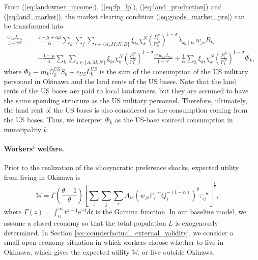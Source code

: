 \documentclass[12pt, unicode, a4paper]{article}
\newcommand{\1}{\mbox{1}\hspace{-0.25em}\mbox{l}} %
\begin{document}
From (\ref{eq:landowner_income}), (\ref{eq:fp_lp}), (\ref{eq:land_production}) and (\ref{eq:land_market}), the market clearing condition (\ref{eq:goods_market_pre}) can be transformed into
\begin{equation}
\label{eq:goods_market}
\begin{split}
    \frac{w_{iN}L_{iN}}{1-\gamma^N}
    =&\frac{1-\mu+\alpha\mu}{\alpha}\sum_k \sum_j \sum_{s \in \{ A,M,N,B \}} \xi_{ki}\chi_{k}^N\left( \frac{P_i^N}{\mathbb{P}_k^N} \right)^{1-\sigma} \lambda_{kj \mid ks}w_{js}R_{ks}\\
    &+\frac{1-\mu}{\alpha}\sum_k \sum_{s \in \{ A,M,N \}} \xi_{ki}\chi_{k}^N\left( \frac{P_i^N}{\mathbb{P}_k^N} \right)^{1-\sigma} \frac{\gamma^sw_{ks}L_{ks}}{1-\gamma^s}
    +\frac{1}{\alpha}\sum_k \xi_{ki}\chi_{k}^N\left( \frac{P_i^N}{\mathbb{P}_k^N} \right)^{1-\sigma} \Phi_k,
\end{split}
\end{equation}
where $\Phi_k \equiv m_k\mathbb{Q}_k^{US}S_k+e_{US}L_k^{US}$ is the sum of the consumption of the US military personnel in Okinawa and the land rents of the US bases. Note that the land rents of the US bases are paid to local landowners, but they are assumed to have the same spending structure as the US military personnel. Therefore, ultimately, the land rent of the US bases is also considered as the consumption coming from the US bases. Thus, we interpret $\Phi_k$ as the US-base sourced consumption in municipality $k$.


\paragraph{Workers' welfare.}

Prior to the realization of the idiosyncratic preference shocks, expected utility from living in Okinawa is
\begin{equation}
\label{eq:welfare}
    \mathbb{W} = \Gamma\left( \frac{\theta-1}{\theta} \right)
    \left[ \sum_i \sum_j \sum_s A_{is}\left( w_{js} \mathbb{P}_{i}^{-\alpha} Q_i^{-(1-\alpha)} \right)^\theta \tau_{ij}^{-\theta} \right]^{\frac{1}{\theta}},
\end{equation}
where $\Gamma(z)=\int_0^\infty t^{z-1}\mathrm{e}^{-t} \mathrm{d}t$ is the Gamma function. In our baseline model, we assume a closed economy so that the total population $L$ is exogenously determined. In Section \ref{sec:counterfactual_external_validity}, we consider a small-open economy situation in which workers choose whether to live in 
 Okinawa, which gives the expected utility $\mathbb{W}$, or live outside Okinawa. 
\end{document}
